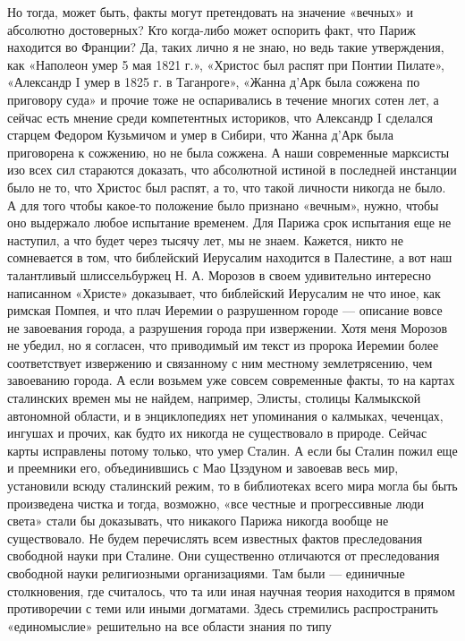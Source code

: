 Но тогда, может быть, факты могут претендовать на значение «вечных» и абсолютно
достоверных? Кто когда-либо может оспорить факт, что Париж находится во
Франции? Да, таких лично я не знаю, но ведь такие утверждения, как «Наполеон
умер 5 мая 1821 г.», «Христос был распят при Понтии Пилате», «Александр I умер
в 1825 г. в Таганроге», «Жанна д'Арк была сожжена по приговору суда» и прочие
тоже не оспаривались в течение многих сотен лет, а сейчас есть мнение среди
компетентных историков, что Александр I сделался старцем Федором Кузьмичом и
умер в Сибири, что Жанна д'Арк была приговорена к сожжению, но не была сожжена.
А наши современные марксисты изо всех сил стараются доказать, что абсолютной
истиной в последней инстанции было не то, что Христос был распят, а то, что
такой личности никогда не было. А для того чтобы какое-то положение было
признано «вечным», нужно, чтобы оно выдержало любое испытание временем. Для
Парижа срок испытания еще не наступил, а что будет через тысячу лет, мы не
знаем. Кажется, никто не сомневается в том, что библейский Иерусалим находится
в Палестине, а вот наш талантливый шлиссельбуржец Н. А. Морозов в своем
удивительно интересно написанном «Христе» доказывает, что библейский Иерусалим
не что иное, как римская Помпея, и что плач Иеремии о разрушенном городе ---
описание вовсе не завоевания города, а разрушения города при извержении. Хотя
меня Морозов не убедил, но я согласен, что приводимый им текст из пророка
Иеремии более соответствует извержению и связанному с ним местному
землетрясению, чем завоеванию города. А если возьмем уже совсем современные
факты, то на картах сталинских времен мы не найдем, например, Элисты, столицы
Калмыкской автономной области, и в энциклопедиях нет упоминания о калмыках,
чеченцах, ингушах и прочих, как будто их никогда не существовало в природе.
Сейчас карты исправлены потому только, что умер Сталин.
А если бы Сталин пожил еще и преемники его, объединившись с Мао Цзэдуном и
завоевав весь мир, установили всюду сталинский режим, то в библиотеках всего
мира могла бы быть произведена чистка и тогда, возможно, «все честные и
прогрессивные люди света» стали бы доказывать, что никакого Парижа никогда
вообще не существовало. Не будем перечислять всем известных фактов
преследования свободной науки при Сталине. Они существенно отличаются от
преследования свободной науки религиозными организациями. Там были ---
единичные столкновения, где считалось, что та или иная научная теория
находится в прямом противоречии с теми или иными догматами. Здесь стремились
распространить «единомыслие» решительно на все области знания по типу
